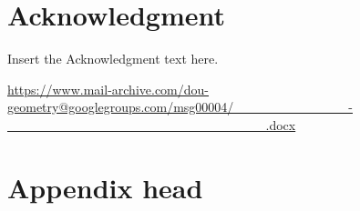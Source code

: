 \documentclass[preprint]{ptephy_v1}%
\begin{document}
\section*{Acknowledgment}

Insert the Acknowledgment text here.


%
%
%


\let\doi\relax


\begin{thebibliography}{9}

        \url{https://www.mail-archive.com/dou-geometry@googlegroups.com/msg00004/____________-___________________________.docx}

\end{thebibliography}

\appendix

\section{Appendix head}



\end{document}
